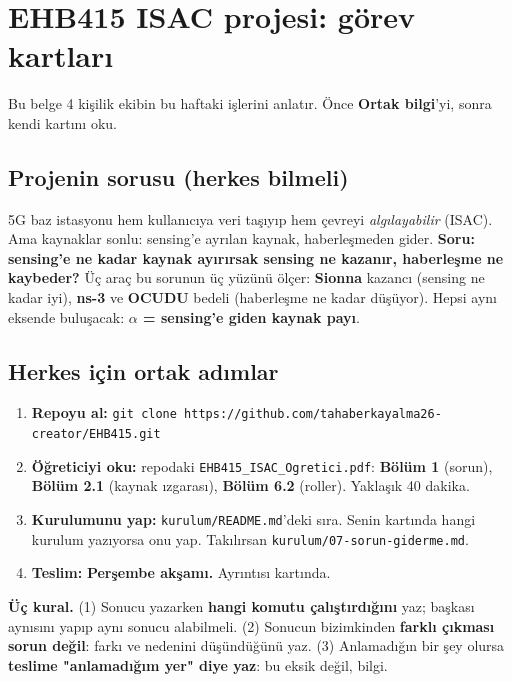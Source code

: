 \documentclass[10.5pt,a4paper]{article}
\begin{document}
\section*{EHB415 ISAC projesi: görev kartları}
{\sffamily\color{muted} Bu belge 4 kişilik ekibin bu haftaki işlerini anlatır. Önce \textbf{Ortak bilgi}'yi, sonra kendi kartını oku.}

\subsection*{Projenin sorusu (herkes bilmeli)}
5G baz istasyonu hem kullanıcıya veri taşıyıp hem çevreyi \emph{algılayabilir} (ISAC). Ama kaynaklar sonlu: sensing'e ayrılan kaynak, haberleşmeden gider.
\textbf{Soru: sensing'e ne kadar kaynak ayırırsak sensing ne kazanır, haberleşme ne kaybeder?}
Üç araç bu sorunun üç yüzünü ölçer: \textbf{Sionna} kazancı (sensing ne kadar iyi), \textbf{ns-3} ve \textbf{OCUDU} bedeli (haberleşme ne kadar düşüyor).
Hepsi aynı eksende buluşacak: \textbf{$\alpha$ = sensing'e giden kaynak payı}.

\subsection*{Herkes için ortak adımlar}
\begin{enumerate}[leftmargin=1.6em]
\item \textbf{Repoyu al:} \texttt{git clone https://github.com/tahaberkayalma26-creator/EHB415.git}
\item \textbf{Öğreticiyi oku:} repodaki \texttt{EHB415\_ISAC\_Ogretici.pdf}: \textbf{Bölüm 1} (sorun), \textbf{Bölüm 2.1} (kaynak ızgarası), \textbf{Bölüm 6.2} (roller). Yaklaşık 40 dakika.
\item \textbf{Kurulumunu yap:} \texttt{kurulum/README.md}'deki sıra. Senin kartında hangi kurulum yazıyorsa onu yap. Takılırsan \texttt{kurulum/07-sorun-giderme.md}.
\item \textbf{Teslim:} \textbf{Perşembe akşamı.} Ayrıntısı kartında.
\end{enumerate}

\begin{tcolorbox}[colback=codebg,colframe=muted,boxrule=0.4pt,arc=2pt,left=6pt,right=6pt,top=3pt,bottom=3pt]
\sffamily\small\textbf{Üç kural.}
(1) Sonucu yazarken \textbf{hangi komutu çalıştırdığını} yaz; başkası aynısını yapıp aynı sonucu alabilmeli.
(2) Sonucun bizimkinden \textbf{farklı çıkması sorun değil}: farkı ve nedenini düşündüğünü yaz.
(3) Anlamadığın bir şey olursa \textbf{teslime "anlamadığım yer" diye yaz}: bu eksik değil, bilgi.
\end{tcolorbox}
\end{document}

